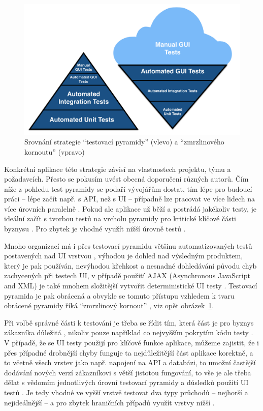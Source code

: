 \begin{figure}[ht]\centering
	\includegraphics[width=1\textwidth]{img/ext/testing_pyramid.png}
	\caption[Srovnání strategie \enquote{testovací pyramidy} a \enquote{zmrzlinového kornoutu}]{Srovnání strategie \enquote{testovací pyramidy} (vlevo) a \enquote{zmrzlinového kornoutu} (vpravo) \cite{test-fishman}}\label{fig:testing_pyramid}
\end{figure}

Konkrétní aplikace této strategie závisí na vlastnostech projektu, týmu a požadavcích. Přesto se pokusím uvést obecná doporučení různých autorů. Čím níže z pohledu test pyramidy se podaří vývojářům dostat, tím lépe pro budoucí práci -- lépe začít např. s API, než s UI -- případně lze pracovat ve více lidech na více úrovních paralelně \cite{test-kitner}. Pokud ale aplikace už běží a postrádá jakékoliv testy, je ideální začít s tvorbou testů na vrcholu pyramidy pro kritické klíčové části byznysu \cite{test-atlassian}. Pro zbytek je vhodné využít nižší úrovně testů \cite{test-atlassian2}.

Mnoho organizací má i přes testovací pyramidu většinu automatizovaných testů postavených nad UI vrstvou \cite{test-devqa}, výhodou je dohled nad výsledným produktem, který je pak používán, nevýhodou křehkost a nesnadné dohledávání původu chyb zachycených při testech UI, v případě použití AJAX (Asynchronous JavaScript and XML) je také mnohem složitější vytvořit deterministické UI testy \cite{test-timothy}. Testovací pyramida je pak obrácená a obvykle se tomuto přístupu vzhledem k tvaru obrácené pyramidy říká \enquote{zmrzlinový kornout} \cite{test-mf1}, viz opět obrázek~\ref{fig:testing_pyramid}. 

Při volbě správné části k testování je třeba se řídit tím, která část je pro byznys zákazníka důležitá \cite{test-kitner}, nikoliv pouze například co nejvyšším pokrytím kódu testy \cite{test-devqa}. V případě, že se UI testy použijí pro klíčové funkce aplikace, můžeme zajistit, že i přes případné drobnější chyby funguje ta nejdůležitější část aplikace korektně, a to včetně všech vrstev jako např. napojení na API a databázi, to umožní častější dodávání nových verzí zákazníkovi s větší jistotou fungování, to vše je ale třeba dělat s vědomím jednotlivých úrovní testovací pyramidy a důsledků použití UI testů \cite{test-novanet}. Je tedy vhodné ve vyšší vrstvě testovat dva typy průchodů -- nejhorší a nejideálnější -- a pro zbytek hraničních případů využít vrstvy nižší \cite{test-dzone}.

